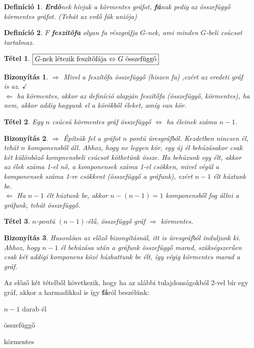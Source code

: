 \documentclass[a4paper,12pt,twoside]{book}
\newtheorem{defi}{Definíció}[chapter]
\newtheorem{tetel}{Tétel}[chapter]
\newtheorem{biz}{Bizonyítás}[chapter]
\theoremstyle{break}
\newtheorem{bizNL}[biz]{Bizonyítás}
\begin{document}
\begin{defi}
 \textbf{Erdő}nek hívjuk a körmentes gráfot, \textbf{fá}nak pedig az összefüggő körmentes gráfot. (Tehát az erdő fák uniója)
\end{defi}

\begin{defi}
 $F$ \textbf{feszítőfa} olyan fa részgráfja $G$-nek, ami minden $G$-beli csúcsot tartalmaz.
\end{defi}

\begin{tetel}
 $\boxed{G$-nek létezik feszítőfája $\Leftrightarrow$ $G$ összefüggő$}$
\end{tetel}
\begin{bizNL}
$\Rightarrow$ Mivel a feszítőfa összefüggő (hiszen fa) ,ezért az eredeti gráf is az. $\checkmark$\\
$\Leftarrow$ ha körmentes, akkor az definíció alapján feszítőfa (összefüggő, körmentes), ha nem, akkor addig hagyunk el a körökből éleket, amíg van kör.
\end{bizNL}

\begin{tetel}
 Egy $n$ csúcsú körmentes gráf összefüggő $\Leftrightarrow$ ha éleinek száma $n-1$.
\end{tetel}
\begin{bizNL}
 $\Rightarrow$ Építsük fel a gráfot $n$ pontú üresgráfból. Kezdetben nincsen él, tehát $n$ komponensből áll. Ahhoz, hogy ne legyen kör, egy új él behúzásakor csak két különböző kompnensbeli csúcsot köthetünk össze. Ha behúzunk egy élt, akkor az élek száma 1-el nő, a komponensek száma 1-el csökken, mivel végül a komponensek száma 1-re csökkent (összefüggő a gráfunk), ezért $n-1$ élt húztunk be.\\
 $\Leftarrow$ Ha $n-1$ élt húztunk be, akkor $n-(n-1)=1$ komponensből fog állni a gráfunk, tehát összefüggő.
\end{bizNL}

\begin{tetel}
 $n$-pontú $(n-1)$-élű, összefüggő gráf $\Rightarrow$ körmentes.
\end{tetel}
\begin{biz}
 Hasonlóan az előző bizonyításnál, itt is üresgráfból induljunk ki. Ahhoz, hogy $n-1$ él behúzása után a gráfunk összefüggő marad, szükségszerűen csak két addigi komponens közé húzhattunk be élt, így végig körmentes marad a gráf.
\end{biz}

Az előző két tételből következik, hogy ha az alábbi tulajdonságokból 2-vel bír egy gráf, akkor a harmadikkal is így \textbf{fá}ról beszélünk:
\begin{itemize*}
 \item $n-1$ darab él
 \item összefüggő
 \item körmentes
\end{itemize*}
\end{document}
